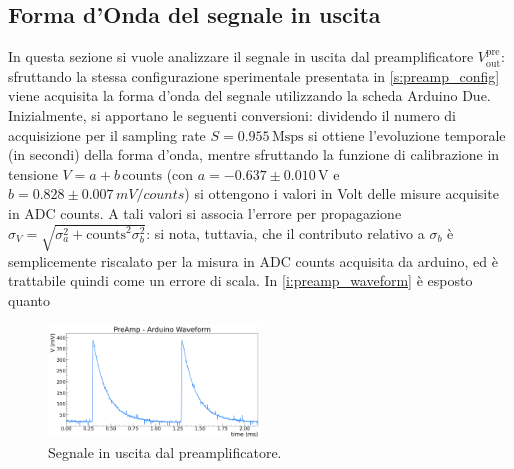 \documentclass[a4paper,11pt]{article} %
\begin{document}
\subsection{Forma d'Onda del segnale in uscita}\label{s:preamp_waveform}

In questa sezione si vuole analizzare il segnale in uscita dal preamplificatore $V^{\text{pre}}_{\text{out}}$:
sfruttando la stessa configurazione sperimentale presentata in \autoref{s:preamp_config} viene acquisita la forma d'onda
del segnale utilizzando la scheda Arduino Due. Inizialmente, si apportano le seguenti conversioni: dividendo il numero
di acquisizione per il sampling rate $S=0.955\,\text{Msps}$ si ottiene l'evoluzione temporale (in secondi) della forma
d'onda, mentre sfruttando la funzione di calibrazione in tensione $V= a  +  b \, \text{counts}$ (con $a=-0.637 \pm
0.010\,\si{\volt}$ e $b=0.828\pm0.007\,\si{mV/counts}$) si ottengono i valori in Volt delle misure acquisite in ADC
counts. A tali valori si associa l'errore per propagazione $\sigma_{V} = \sqrt{\sigma_a^2+\text{counts}^2\sigma_b^2}$:
si nota, tuttavia, che il contributo relativo a $\sigma_b$ è semplicemente riscalato per la misura in ADC counts
acquisita da arduino, ed è trattabile quindi come un errore di scala. In \autoref{i:preamp_waveform} è esposto quanto

\begin{figure}
	\centering
	\includegraphics[width=0.5\textwidth]{../Plots/PreAmp/preamp_waveform.png}
	\caption{\small Segnale in uscita dal preamplificatore.}
	\label{i:preamp_waveform}
\end{figure}
\end{document}
